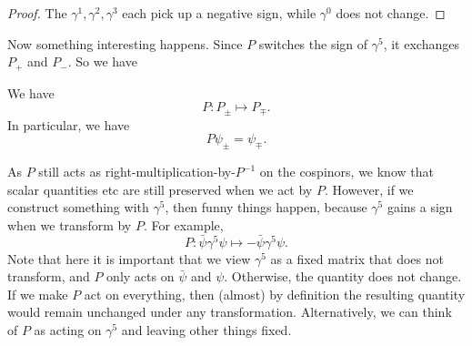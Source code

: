 \documentclass[a4paper]{article}
\begin{document}
\begin{proof}
  The $\gamma^1, \gamma^2, \gamma^3$ each pick up a negative sign, while $\gamma^0$ does not change.
\end{proof}

Now something interesting happens. Since $P$ switches the sign of $\gamma^5$, it exchanges $P_+$ and $P_-$. So we have
\begin{prop}
  We have
  \[
    P: P_{\pm} \mapsto P_{\mp}.
  \]
  In particular, we have
  \[
    P \psi_\pm = \psi_{\mp}.
  \]
\end{prop}

As $P$ still acts as right-multiplication-by-$P^{-1}$ on the cospinors, we know that scalar quantities etc are still preserved when we act by $P$. However, if we construct something with $\gamma^5$, then funny things happen, because $\gamma^5$ gains a sign when we transform by $P$. For example,
\[
  P: \bar \psi \gamma^5 \psi \mapsto -\bar \psi \gamma^5 \psi.
\]
Note that here it is important that we view $\gamma^5$ as a fixed matrix that does not transform, and $P$ only acts on $\bar\psi$ and $\psi$. Otherwise, the quantity does not change. If we make $P$ act on everything, then (almost) by definition the resulting quantity would remain unchanged under any transformation. Alternatively, we can think of $P$ as acting on $\gamma^5$ and leaving other things fixed. %
\end{document}
